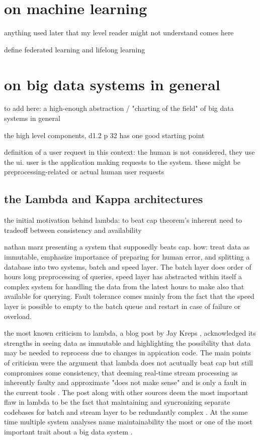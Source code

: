 \section{on machine learning}

anything used later that my level reader might not understand comes here

define federated learning and lifelong learning

\section{on big data systems in general}

to add here: a high-enough abstraction / "charting of the field" of big data systems in general

the high level components, d1.2 p 32 has one good starting point

definition of a user request in this context: the human is not considered, they use the ui. user is the application making requests to the system. these might be preprocessing-related or actual human user requests

\subsection{the Lambda and Kappa architectures}


the initial motivation behind lambda: to beat cap theorem's inherent need to tradeoff between consistency and availability \cite{lambdakappa}

nathan marz presenting a system that supposedly beats cap. how: treat data as immutable, emphasize importance of preparing for human error, and splitting a database into two systems, batch and speed layer. The batch layer does order of hours long preprocessing of queries, speed layer has  abstracted within itself a complex system for handling the data from the latest hours to make also that available for querying. Fault tolerance comes mainly from the fact that the speed layer is possible to empty to the batch queue and restart in case of failure or overload.

the most known criticism to lambda, a blog post by Jay Kreps \cite{questioninglambda}, acknowledged its strengths in seeing data as immutable and highlighting the possibility that data may be needed to reprocess due to changes in appication code. The main points of criticism were the argument that lambda does not acutually beat cap but still compromises some consistency, that deeming real-time stream processing as inherently faulty and approximate "does not make sense" and is only a fault in the current tools \cite{questioninglambda}. The post along with other sources deem the most important flaw in lambda to be the fact that maintaining and syncronizing separate codebases for batch and stream layer to be redundantly complex \cite{uber} \cite{facebook}. At the same time multiple system analyses name maintainability the most or one of the most important trait about a big data system \cite{facebook} \cite{storm@twitter}.

